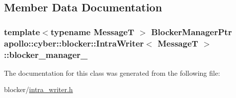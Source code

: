 \subsection{Member Data Documentation}
\hypertarget{classapollo_1_1cyber_1_1blocker_1_1IntraWriter_a9e27c825322758f604452cebf6ce0313}{
\subsubsection[{blocker\-\_\-manager\-\_\-}]{\setlength{\rightskip}{0pt plus 5cm}template$<$typename Message\-T $>$ {\bf Blocker\-Manager\-Ptr} {\bf apollo\-::cyber\-::blocker\-::\-Intra\-Writer}$<$ Message\-T $>$\-::blocker\-\_\-manager\-\_\-\hspace{0.3cm}{\ttfamily [private]}}}\label{classapollo_1_1cyber_1_1blocker_1_1IntraWriter_a9e27c825322758f604452cebf6ce0313}


The documentation for this class was generated from the following file\-:\begin{DoxyCompactItemize}
\item 
blocker/\hyperlink{intra__writer_8h}{intra\-\_\-writer.\-h}\end{DoxyCompactItemize}
